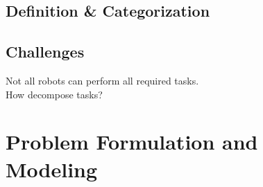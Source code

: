 \documentclass[a4paper]{article}
\begin{document}
\subsection{Definition \& Categorization}

\subsection{Challenges}
Not all robots can perform all required tasks.\\
How decompose tasks?\\





%

\section{Problem Formulation and Modeling}


%
%
\end{document}
